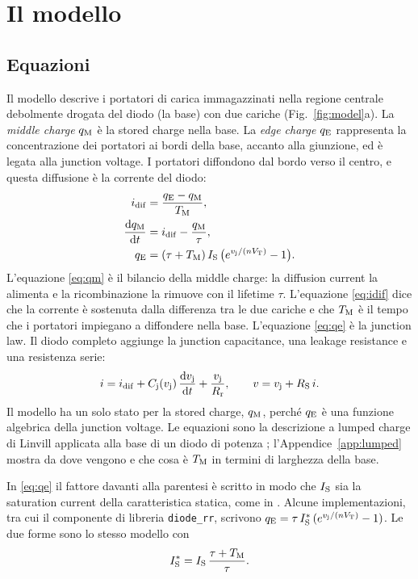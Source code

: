 \documentclass[10pt,a4paper]{scrartcl}
\let\newcommand\lmitdefine
\newcommand{\TM}{T_\mathrm{M}}
\newcommand{\qE}{q_\mathrm{E}}
\newcommand{\qM}{q_\mathrm{M}}
\newcommand{\idif}{i_\mathrm{dif}}
\newcommand{\vj}{v_\mathrm{j}}
\newcommand{\IS}{I_\mathrm{S}}
\newcommand{\RS}{R_\mathrm{S}}
\newcommand{\Rr}{R_\mathrm{r}}
\newcommand{\VT}{V_\mathrm{T}}
\newcommand{\Cj}{C_\mathrm{j}}
\newcommand{\diff}{\mathrm{d}}
\begin{document}
\section{Il modello}
\label{sec:model}
\subsection{Equazioni}
Il modello descrive i portatori di carica immagazzinati nella regione centrale debolmente drogata del diodo (la base) con due cariche (Fig.~\ref{fig:model}a). La \emph{middle charge} $\qM$ è la stored charge nella base. La \emph{edge charge} $\qE$ rappresenta la concentrazione dei portatori ai bordi della base, accanto alla giunzione, ed è legata alla junction voltage. I portatori diffondono dal bordo verso il centro, e questa diffusione è la corrente del diodo:
\begin{align}
\idif &= \frac{\qE - \qM}{\TM} , \label{eq:idif}\\
\frac{\diff \qM}{\diff t} &= \idif - \frac{\qM}{\tau} , \label{eq:qm}\\
\qE &= (\tau+\TM)\,\IS\,\bigl(e^{\vj/(n\VT)} - 1\bigr) . \label{eq:qe}
\end{align}
L'equazione \eqref{eq:qm} è il bilancio della middle charge: la diffusion current la alimenta e la ricombinazione la rimuove con il lifetime $\tau$. L'equazione \eqref{eq:idif} dice che la corrente è sostenuta dalla differenza tra le due cariche e che $\TM$ è il tempo che i portatori impiegano a diffondere nella base. L'equazione \eqref{eq:qe} è la junction law. Il diodo completo aggiunge la junction capacitance, una leakage resistance e una resistenza serie:
\begin{equation}
i = \idif + \Cj(\vj)\,\frac{\diff \vj}{\diff t} + \frac{\vj}{\Rr} , \qquad v = \vj + \RS\, i .
\label{eq:terminal}
\end{equation}
Il modello ha un solo stato per la stored charge, $\qM$, perché $\qE$ è una funzione algebrica della junction voltage. Le equazioni sono la descrizione a lumped charge di Linvill \cite{linvill1958} applicata alla base di un diodo di potenza \cite{lauritzen1991}; l'Appendice~\ref{app:lumped} mostra da dove vengono e che cosa è $\TM$ in termini di larghezza della base.

In \eqref{eq:qe} il fattore davanti alla parentesi è scritto in modo che $\IS$ sia la saturation current della caratteristica statica, come in \cite{mathworks}. Alcune implementazioni, tra cui il componente di libreria \texttt{diode\_rr}, scrivono $\qE = \tau\,\IS^{*}\,(e^{\vj/(n\VT)}-1)$. Le due forme sono lo stesso modello con
\begin{equation}
\IS^{*} = \IS\,\frac{\tau+\TM}{\tau} .
\label{eq:isstar}
\end{equation}
\end{document}
